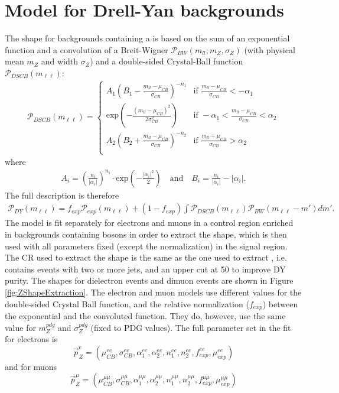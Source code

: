 \section*{Model for Drell-Yan backgrounds }
\noindent\justify
The shape for backgrounds containing a \PZ is based on the sum of an exponential function and a convolution of a Breit-Wigner $\mathcal{P}_{BW}(m_{ll};m_{Z},\sigma_{Z})$ (with physical mean $m_{Z}$ and width $\sigma_{Z}$) and a double-sided Crystal-Ball function $\mathcal{P}_{DSCB}(m_{\ell\ell})$: 
\begin{eqnarray*}
\mathcal{P}_{DSCB}(m_{\ell\ell}) = \begin{cases} A_{1} (B_{1}-\frac{m_{ll}-\mu_{CB}}{\sigma_{CB}})^{-n_{1}} &\mbox{if } \frac{m_{ll}-\mu_{CB}}{\sigma_{CB}}<-\alpha_{1} \\
\textrm{exp}\left(-\frac{(m_{ll}-\mu_{CB})^2}{2\sigma_{CB}^2}\right) &\mbox{if } -\alpha_{1}<\frac{m_{ll}-\mu_{CB}}{\sigma_{CB}}<\alpha_{2} \\
A_{2} (B_{2}+\frac{m_{ll}-\mu_{CB}}{\sigma_{CB}})^{-n_{2}} &\mbox{if } \frac{m_{ll}-\mu_{CB}}{\sigma_{CB}}>\alpha_{2} \\
\end{cases}
\end{eqnarray*}
where
\begin{eqnarray*}
A_{i} = \left(\frac{n_{i}}{|\alpha_{i}|}\right)^{n_{i}} \cdot \textrm{exp}\left(-\frac{|\alpha_{i}|^2}{2}\right) \quad \textrm{and}\quad B_{i} = \frac{n_{i}}{|\alpha_{i}|}-|\alpha_{i}| .
\end{eqnarray*}
The full description is therefore 
\begin{eqnarray*}
\mathcal{P}_{DY} (m_{\ell\ell}) = f_{exp}\mathcal{P}_{exp}(m_{\ell\ell})+(1-f_{exp})\int \mathcal{P}_{DSCB}(m_{\ell\ell})\mathcal{P}_{BW}(m_{\ell\ell}-m') dm' .
\end{eqnarray*}
The model is fit separately for electrons and muons in a control region enriched in backgrounds containing \PZ bosons in order to extract the shape, which is then used with all parameters fixed (except the normalization) in the signal region. 
The CR used to extract the shape is the same as the one used to extract \Routin, i.e. contains events with two or more jets, and an upper \ptmiss cut at 50 \GeV to improve DY purity. 
The shapes for dielectron events and dimuon events are shown in Figure \ref{fig:ZShapeExtraction}.
The electron and muon models use different values for the double-sided Crystal Ball function, and the relative normalization ($f_{exp}$) 
between the exponential and the convoluted function. They do, however, use the same value 
for $m_{Z}^{pdg}$ and $\sigma_{Z}^{pdg}$ (fixed to PDG values). The full parameter set in the fit for electrons is
\begin{equation*}
\vec{p}_{Z}^{e} = (\mu_{CB}^{ee}, \sigma_{CB}^{ee},\alpha_{1}^{ee},\alpha_{2}^{ee},n_{1}^{ee},n_{2}^{ee},f_{exp}^{ee},\mu_{exp}^{ee})
\end{equation*}
and for muons 
\begin{equation*}
\vec{p}_{Z}^{\mu} = (\mu_{CB}^{\mu\mu}, \sigma_{CB}^{\mu\mu},\alpha_{1}^{\mu\mu},\alpha_{2}^{\mu\mu},n_{1}^{\mu\mu},n_{2}^{\mu\mu},f_{exp}^{\mu\mu},\mu_{exp}^{\mu\mu})
\end{equation*}

